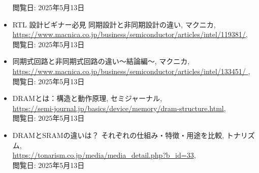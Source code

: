 \documentclass{jlreq}
\numberwithin{equation}{section}
\begin{document}
\begin{itemize}
閲覧日: 2025年5月13日\
\item RTL 設計ビギナー必見 同期設計と非同期設計の違い, マクニカ, \\
\url{https://www.macnica.co.jp/business/semiconductor/articles/intel/119381/}, \\
閲覧日: 2025年5月13日
\item 同期式回路と非同期式回路の違い～結論編～, マクニカ, \\
\url{https://www.macnica.co.jp/business/semiconductor/articles/intel/133451/ }, \\
閲覧日: 2025年5月13日
\item DRAMとは：構造と動作原理, セミジャーナル, \\
\url{https://semi-journal.jp/basics/device/memory/dram-structure.html}, \\
閲覧日: 2025年5月13日
\item DRAMとSRAMの違いは？ それぞれの仕組み・特徴・用途を比較, トナリズム, \\
\url{https://tonarism.co.jp/media/media_detail.php?b_id=33}, \\
閲覧日: 2025年5月13日
\end{itemize}
\end{document}

